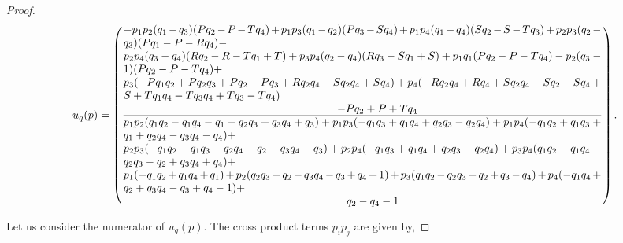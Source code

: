 \documentclass[10pt]{article}
\providecommand{\DIFaddend}{} %
\DeclareRobustCommand{\DIFaddend}{\DIFOaddend \let\includegraphics\DIFOincludegraphics} %
\begin{document}
\begin{proof}
    \begingroup
    \scriptsize
    \begin{equation*}
        u_q(p) =
        \left(
          \frac
            {\parbox{6in}{$ - p_{1} p_{2} (q_{1} - q_{3}) (P q_{2} - P - T q_{4}) + p_{1} p_{3} (q_{1} - q_{2}) (P q_{3} - S q_{4}) + p_{1} p_{4} (q_{1} - q_{4}) (S q_{2} - S - T q_{3}) + p_{2} p_{3} (q_{2} - q_{3}) (P q_{1} - P - R q_{4}) - $ \\
            $ p_{2} p_{4} (q_{3} - q_{4}) (R q_{2} - R - T q_{1} + T) + p_{3} p_{4} (q_{2} - q_{4}) (R q_{3} - S q_{1} + S) + p_{1} q_{1} (P q_{2} - P - T q_{4}) - p_{2} (q_{3} - 1) (P q_{2} - P - T q_{4}) + $ \\
            $ p_{3} (- P q_{1} q_{2} + P q_{2} q_{3} + P q_{2} - P q_{3} + R q_{2} q_{4} - S q_{2} q_{4} + S q_{4}) + p_{4} (- R q_{2} q_{4} + R q_{4} + S q_{2} q_{4} - S q_{2} - S q_{4} + S + T q_{1} q_{4} - T q_{3} q_{4} + T q_{3} - T q_{4}) $ \\
            \hspace*{6.7cm} $- P q_{2} + P + T q_{4}$
            }}
            {\parbox{6in}{$
            p_{1} p_{2} (q_{1} q_{2} - q_{1} q_{4} - q_{1} - q_{2} q_{3} + q_{3} q_{4} + q_{3}) + p_{1} p_{3} (- q_{1} q_{3} + q_{1} q_{4} + q_{2} q_{3} - q_{2} q_{4}) + p_{1} p_{4} (- q_{1} q_{2} + q_{1} q_{3} + q_{1} + q_{2} q_{4} - q_{3} q_{4} - q_{4}) +$ \\
            $ p_{2} p_{3} (- q_{1} q_{2} + q_{1} q_{3} + q_{2} q_{4} + q_{2} - q_{3} q_{4} - q_{3}) + p_{2} p_{4} (- q_{1} q_{3} + q_{1} q_{4} + q_{2} q_{3} - q_{2} q_{4}) + p_{3} p_{4} (q_{1} q_{2} - q_{1} q_{4} - q_{2} q_{3} - q_{2} + q_{3} q_{4} + q_{4}) + $ \\
            $ p_{1} (- q_{1} q_{2} + q_{1} q_{4} + q_{1}) + p_{2} (q_{2} q_{3} - q_{2} - q_{3} q_{4} - q_{3} + q_{4} + 1) + p_{3} (q_{1} q_{2} - q_{2} q_{3} - q_{2} + q_{3} - q_{4}) + p_{4} (- q_{1} q_{4} + q_{2} + q_{3} q_{4} - q_{3} + q_{4} - 1) + $ \\
            \hspace*{7cm} $q_{2} - q_{4} - 1$
          }}
        \right).
    \end{equation*}
    \endgroup

    \DIFaddend Let us consider the numerator of \(u_q(p)\). The cross product terms
    \(p_ip_j\) are given by,


\end{proof}
\end{document}
